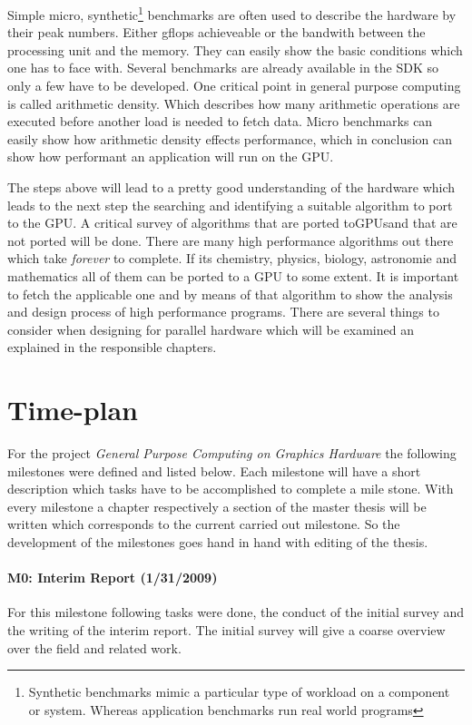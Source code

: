 Simple micro, synthetic\footnote{Synthetic benchmarks mimic a particular type of
workload on a component or system. Whereas application benchmarks run real world
programs} benchmarks are often used to describe the hardware by their peak
numbers. Either gflops achieveable or the bandwith between the processing unit
and the memory. They can easily show the basic conditions which one has to face 
with. Several benchmarks are already available in the SDK so only a few have to 
be developed. One critical point in general purpose computing is called
arithmetic density. Which describes how many arithmetic operations are executed
before another load is needed to fetch data. Micro benchmarks can easily show 
how arithmetic density effects performance, which in conclusion can show how 
performant an application will run on the GPU. 

The steps above will lead to a pretty good understanding of the hardware which
leads to the next step the searching and identifying a suitable algorithm to
port to the GPU. A critical survey of algorithms that are ported to\glspl{GPU}and
that are not ported will be done. There are many high performance algorithms out
there which take \emph{forever} to complete. If its chemistry, physics, biology,
astronomie and mathematics all of them can be ported to a \gls{GPU} to some extent. It
is important to fetch the applicable one and by means of that algorithm to show
the analysis and design process of high performance programs. There are
several things to consider when designing for parallel hardware which will be
examined an explained in the responsible chapters.

\section*{Time-plan} 
\label{sub:time_plan} 
For the project \emph{General Purpose Computing on Graphics Hardware} the
following milestones were defined and listed below. Each milestone will have a
short description which tasks have to be accomplished to complete a mile stone.
With every milestone a chapter respectively a section of the master thesis will
be written which corresponds to the current carried out milestone. So the 
development of the milestones goes hand in hand with editing of the thesis.

\paragraph{M0: Interim Report (1/31/2009)} %
\label{par:interim_report}
For this milestone following tasks were done, the conduct of the initial survey 
and the writing of the interim report. The initial survey will give a coarse 
overview over the field and related work. 

